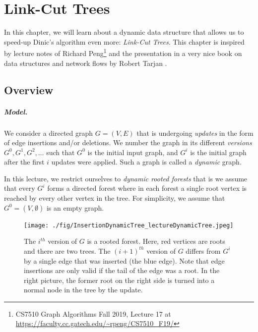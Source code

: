 \chapter{Link-Cut Trees}
\newcommand{\key}{\operatorname{key}}
\newcommand{\prio}{\operatorname{prio}}

In this chapter, we will learn about a dynamic data structure that allows us to speed-up Dinic's algorithm even more: \emph{Link-Cut Trees}. This chapter is inspired by lecture notes of Richard Peng\footnote{CS7510 Graph Algorithms Fall 2019, Lecture 17 at \url{https://faculty.cc.gatech.edu/~rpeng/CS7510\_F19/}} and the presentation in a very nice book on data structures and network flows by Robert Tarjan \cite{tarjan1983data}.

\section{Overview}

\paragraph{Model.} We consider a directed graph $G=(V,E)$ that is undergoing \emph{updates} in the form of edge insertions and/or deletions. We number the graph in its different \emph{versions} $G^0, G^1, G^2, \dots$ such that $G^0$ is the initial input graph, and $G^i$ is the initial graph after the first $i$ updates were applied. Such a graph is called a \emph{dynamic} graph.

In this lecture, we restrict ourselves to \emph{dynamic rooted forests} that is we assume that every $G^i$ forms a directed forest where in each forest a single root vertex is reached by every other vertex in the tree. For simplicity, we assume that $G^0 = (V, \emptyset)$ is an empty graph.

\begin{figure}[!ht]
    \centering
    \texttt{[image: ./fig/InsertionDynamicTree\_lectureDynamicTree.jpeg]}
    \caption{The $i^{th}$ version of $G$ is a rooted forest. Here, red vertices are roots and there are two trees. The $(i+1)^{th}$ version of $G$ differs from $G^i$ by a single edge that was inserted (the blue edge). Note that edge insertions are only valid if the tail of the edge was a root. In the right picture, the former root on the right side is turned into a normal node in the tree by the update.}
    \label{fig:my_label}
\end{figure}

